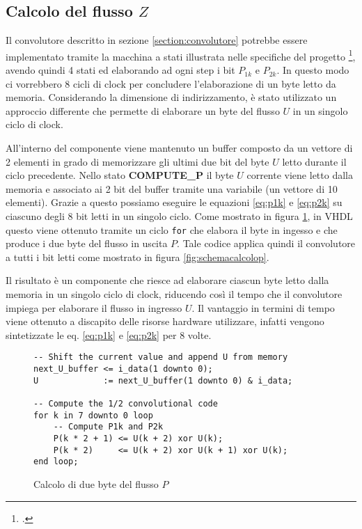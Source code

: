 \subsection{Calcolo del flusso \texorpdfstring{$Z$}{}}
\label{section:calcolodiz}

Il convolutore descritto in sezione \ref{section:convolutore} potrebbe essere implementato tramite la macchina a stati illustrata nelle specifiche del progetto \footcite{specifichedelprogetto}, avendo quindi 4 stati ed elaborando ad ogni step i bit $P_{1k}$ e $P_{2k}$. In questo modo ci vorrebbero 8 cicli di clock per concludere l'elaborazione di un byte letto da memoria. Considerando la dimensione di indirizzamento, è stato utilizzato un approccio differente che permette di elaborare un byte del flusso $U$ in un singolo ciclo di clock.

All'interno del componente viene mantenuto un buffer composto da un vettore di 2 elementi in grado di memorizzare gli ultimi due bit del byte $U$ letto durante il ciclo precedente. Nello stato \textbf{COMPUTE\_P} il byte $U$ corrente viene letto dalla memoria e associato ai 2 bit del buffer tramite una variabile (un vettore di 10 elementi). Grazie a questo possiamo eseguire le equazioni \ref{eq:p1k} e \ref{eq:p2k} su ciascuno degli 8 bit letti in un singolo ciclo. Come mostrato in figura \ref{code:calcolop}, in VHDL questo viene ottenuto tramite un ciclo \verb|for| che elabora il byte in ingesso e che produce i due byte del flusso in uscita $P$. Tale codice applica quindi il convolutore a tutti i bit letti come mostrato in figura \ref{fig:schemacalcolop}.

Il risultato è un componente che riesce ad elaborare ciascun byte letto dalla memoria in un singolo ciclo di clock, riducendo così il tempo che il convolutore impiega per elaborare il flusso in ingresso $U$. Il vantaggio in termini di tempo viene ottenuto a discapito delle risorse hardware utilizzare, infatti vengono sintetizzate le eq. \ref{eq:p1k} e \ref{eq:p2k} per 8 volte.

\begin{figure}[!ht]
    \centering
    \begin{varwidth}{\linewidth}
        \begin{verbatim}
-- Shift the current value and append U from memory
next_U_buffer <= i_data(1 downto 0);
U             := next_U_buffer(1 downto 0) & i_data;

-- Compute the 1/2 convolutional code
for k in 7 downto 0 loop
    -- Compute P1k and P2k
    P(k * 2 + 1) <= U(k + 2) xor U(k);
    P(k * 2)     <= U(k + 2) xor U(k + 1) xor U(k);
end loop;
    \end{verbatim}
    \end{varwidth}
    \caption{Calcolo di due byte del flusso $P$}
    \label{code:calcolop}
\end{figure}

